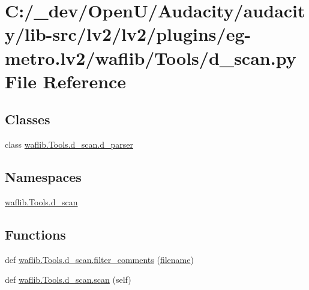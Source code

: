 \hypertarget{lv2_2plugins_2eg-metro_8lv2_2waflib_2_tools_2d__scan_8py}{}\section{C\+:/\+\_\+dev/\+Open\+U/\+Audacity/audacity/lib-\/src/lv2/lv2/plugins/eg-\/metro.lv2/waflib/\+Tools/d\+\_\+scan.py File Reference}
\label{lv2_2plugins_2eg-metro_8lv2_2waflib_2_tools_2d__scan_8py}
\subsection*{Classes}
\begin{DoxyCompactItemize}
\item 
class \hyperlink{classwaflib_1_1_tools_1_1d__scan_1_1d__parser}{waflib.\+Tools.\+d\+\_\+scan.\+d\+\_\+parser}
\end{DoxyCompactItemize}
\subsection*{Namespaces}
\begin{DoxyCompactItemize}
\item 
 \hyperlink{namespacewaflib_1_1_tools_1_1d__scan}{waflib.\+Tools.\+d\+\_\+scan}
\end{DoxyCompactItemize}
\subsection*{Functions}
\begin{DoxyCompactItemize}
\item 
def \hyperlink{namespacewaflib_1_1_tools_1_1d__scan_a69a1f7647c38122c357199fd7b4444d3}{waflib.\+Tools.\+d\+\_\+scan.\+filter\+\_\+comments} (\hyperlink{test__portburn_8cpp_a7efa5e9c7494c7d4586359300221aa5d}{filename})
\item 
def \hyperlink{namespacewaflib_1_1_tools_1_1d__scan_ac5685815562961157b97476a3a3658ca}{waflib.\+Tools.\+d\+\_\+scan.\+scan} (self)
\end{DoxyCompactItemize}
